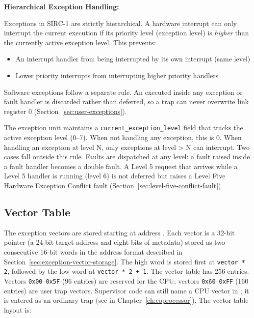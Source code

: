 \textbf{Hierarchical Exception Handling:}

Exceptions in SIRC-1 are strictly hierarchical. A hardware interrupt can only interrupt the current execution if its
priority level (exception level) is \textit{higher} than the currently active exception level. This prevents:

\begin{itemize}
	\item An interrupt handler from being interrupted by its own interrupt (same level)
	\item Lower priority interrupts from interrupting higher priority handlers
\end{itemize}

Software exceptions follow a separate rule. An  executed inside any exception or fault handler is
discarded rather than deferred, so a trap can never overwrite link register 0 (Section~\ref{sec:user-exceptions}).

The exception unit maintains a \texttt{current\_exception\_level} field that tracks the active exception level (0--7).
When not handling any exception, this is 0. When handling an exception at level N, only exceptions at level > N can
interrupt. Two cases fall outside this rule. Faults are dispatched at any level: a fault raised inside a fault handler
becomes a double fault. A Level 5 request that arrives while a Level 5 handler is running (level 6) is not deferred but
raises a Level Five Hardware Exception Conflict fault (Section~\ref{sec:level-five-conflict-fault}).

\subsection{Vector Table}

The exception vectors are stored starting at address . Each vector is a 32-bit pointer (a 24-bit target
address and eight bits of metadata) stored as two consecutive 16-bit words in the address format described in
Section~\ref{sec:exception-vector-storage}. The high word is stored first at \texttt{vector * 2}, followed by the low
word at \texttt{vector * 2 + 1}. The vector table has 256 entries. Vectors \texttt{0x00}--\texttt{0x5F} (96 entries)
are reserved for the CPU; vectors \texttt{0x60}--\texttt{0xFF} (160 entries) are user trap vectors. Supervisor code can
still name a CPU vector in ; it is entered as an ordinary trap (see  in
Chapter~\ref{ch:coprocessor}). The vector table layout is:

